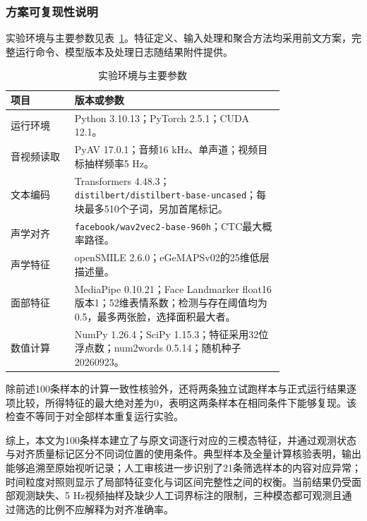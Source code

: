 \subsubsection{方案可复现性说明}
\label{sec:p1_reproducibility}

实验环境与主要参数见表~\ref{tab:p1_repro_settings}。特征定义、输入处理和聚合方法均采用前文方案，完整运行命令、模型版本及处理日志随结果附件提供。

\begin{table}[H]
    \centering\small
    \caption{实验环境与主要参数}
    \label{tab:p1_repro_settings}
    \renewcommand{\arraystretch}{1.15}
    \begin{tabular}{@{}>{\raggedright\arraybackslash}p{0.18\linewidth}>{\raggedright\arraybackslash}p{0.59\linewidth}@{}}
        \toprule
        项目 & 版本或参数\\ \midrule
        运行环境 & Python 3.10.13；PyTorch 2.5.1；CUDA 12.1。\\
        音视频读取 & PyAV 17.0.1；音频16 kHz、单声道；视频目标抽样频率5 Hz。\\
        文本编码 & Transformers 4.48.3；\nolinkurl{distilbert/distilbert-base-uncased}；每块最多510个子词，另加首尾标记。\\
        声学对齐 & \nolinkurl{facebook/wav2vec2-base-960h}；CTC最大概率路径。\\
        声学特征 & openSMILE 2.6.0；eGeMAPSv02的25维低层描述量。\\
        面部特征 & MediaPipe 0.10.21；Face Landmarker float16版本1；52维表情系数；检测与存在阈值均为0.5，最多两张脸，选择面积最大者。\\
        数值计算 & NumPy 1.26.4；SciPy 1.15.3；特征采用32位浮点数；num2words 0.5.14；随机种子20260923。\\
        \bottomrule
    \end{tabular}
\end{table}

除前述100条样本的计算一致性核验外，还将两条独立试跑样本与正式运行结果逐项比较，所得特征的最大绝对差为0，表明这两条样本在相同条件下能够复现。该检查不等同于对全部样本重复运行实验。

综上，本文为100条样本建立了与原文词逐行对应的三模态特征，并通过观测状态与对齐质量标记区分不同词位置的使用条件。典型样本及全量计算核验表明，输出能够追溯至原始视听记录；人工审核进一步识别了21条筛选样本的内容对应异常；时间粒度对照则显示了局部特征变化与词区间完整性之间的权衡。当前结果仍受面部观测缺失、5 Hz视频抽样及缺少人工词界标注的限制，三种模态都可观测且通过筛选的比例不应解释为对齐准确率。
